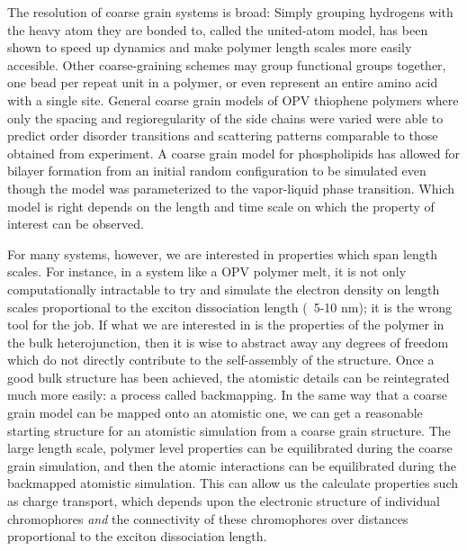 The resolution of coarse grain systems is broad:
Simply grouping hydrogens with the heavy atom they are bonded to, called the united-atom model, has been shown to speed up dynamics and make polymer length scales more easily accesible\cite{Paul1995a, Yang2006a}.
Other coarse-graining schemes may group functional groups together\cite{Berendsen2010, Jankowski2013, Marsh2014}, one bead per repeat unit in a polymer\cite{Lee2011}, or even represent an entire amino acid with a single site\cite{Peng2019}.
General coarse grain models of OPV thiophene polymers where only the spacing and regioregularity of the side chains were varied were able to predict order disorder transitions and scattering patterns comparable to those obtained from experiment\cite{Jankowski2013, Marsh2014}.
A coarse grain model for phospholipids has allowed for bilayer formation from an initial random configuration to be simulated even though the model was parameterized to the vapor-liquid phase transition\cite{Shelley2001}.
Which model is right depends on the length and time scale on which the property of interest can be observed.

For many systems, however, we are interested in properties which span length scales.
For instance, in a system like a OPV polymer melt, it is not only computationally intractable to try and simulate the electron density on length scales proportional to the exciton dissociation length (~5-10 nm)\cite{Huang2010}; it is the wrong tool for the job.
If what we are interested in is the properties of the polymer in the bulk heterojunction, then it is wise to abstract away any degrees of freedom which do not directly contribute to the self-assembly of the structure.
Once a good bulk structure has been achieved, the atomistic details can be reintegrated much more easily: a process called backmapping.
In the same way that a coarse grain model can be mapped onto an atomistic one, we can get a reasonable starting structure for an atomistic simulation from a coarse grain structure.
The large length scale, polymer level properties can be equilibrated during the coarse grain simulation, and then the atomic interactions can be equilibrated during the backmapped atomistic simulation.
This can allow us the calculate properties such as charge transport, which depends upon the electronic structure of individual chromophores \textit{and} the connectivity of these chromophores over distances proportional to the exciton dissociation length.

